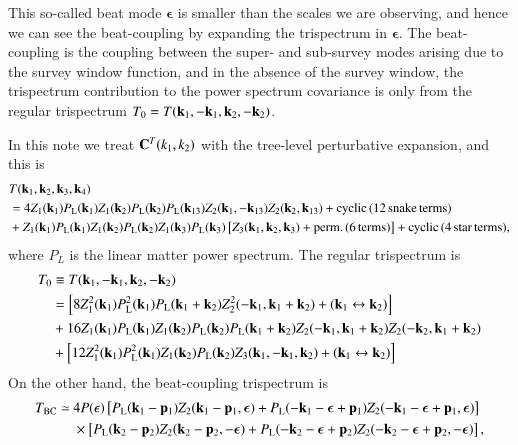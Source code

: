 \documentclass[onecolumn,showpacs,amsmath,amssymb,prd,floatfix,preprintnumbers]{revtex4}
\newcommand{\bk}{{\bf k}}
\newcommand{\bp}{{\bf p}}
\begin{document}
This so-called beat mode ${\boldsymbol \epsilon}$ is smaller than the scales we are observing, and hence we can see the beat-coupling by expanding the trispectrum in ${\boldsymbol \epsilon}$.
The beat-coupling is the coupling between the super- and sub-survey modes arising due to the survey window function, and in the absence of the survey window, the trispectrum contribution to the power spectrum covariance is only from the regular trispectrum $T_0 = T(\bk_1, -\bk_1, \bk_2, -\bk_2)$. 

In this note we treat ${\bf C}^T(k_1,k_2)$ with the tree-level perturbative expansion, and this is 
\begin{align}
  &T(\bk_1, \bk_2, \bk_3, \bk_4) \nonumber \\
  &= 4 Z_1(\bk_1) P_{\rm L}(\bk_1) Z_1(\bk_2) P_{\rm L}(\bk_2) P_{\rm L}(\bk_{13}) Z_2(\bk_1,-\bk_{13}) Z_2(\bk_2,\bk_{13}) + {\rm cyclic} \,(12 \,{\rm snake\,terms}) \nonumber \\
  &+ Z_1(\bk_1) P_{\rm L}(\bk_1) Z_1(\bk_2) P_{\rm L}(\bk_2) Z_1(\bk_3) P_{\rm L}(\bk_3) \left[ Z_3(\bk_1, \bk_2, \bk_3) + {\rm perm.} \,(6\,{\rm terms}) \right] + {\rm cyclic} \,(4\,{\rm star\,terms}),
\end{align}
where $P_L$ is the linear matter power spectrum.
The regular trispectrum is
\begin{align}
\label{eq:trispec_regular}
  T_0 &\equiv T(\bk_1, -\bk_1, \bk_2, -\bk_2) \nonumber \\
  &= \left[ 8 Z_1^2(\bk_1) P_{\rm L}^2(\bk_1) P_{\rm L}(\bk_1+\bk_2) Z_2^2(-\bk_1,\bk_1+\bk_2) + (\bk_1 \leftrightarrow \bk_2) \right] \nonumber \\
  &+ 16 Z_1(\bk_1) P_{\rm L}(\bk_1) Z_1(\bk_2) P_{\rm L}(\bk_2) P_{\rm L}(\bk_1+\bk_2) Z_2(-\bk_1,\bk_1+\bk_2) Z_2(-\bk_2,\bk_1+\bk_2) \nonumber \\
  &+ \left[ 12 Z_1^2(\bk_1) P_{\rm L}^2(\bk_1) Z_1(\bk_2) P_{\rm L}(\bk_2) Z_3(\bk_1,-\bk_1,\bk_2) + (\bk_1 \leftrightarrow \bk_2) \right]
\end{align}
On the other hand, the beat-coupling trispectrum is
\begin{align}
\label{eq:trispec_bc}
  T_{\rm BC} \simeq &~4P(\epsilon) \left[ P_{\rm L}(\bk_1-\bp_1) Z_2(\bk_1-\bp_1, {\boldsymbol \epsilon}) + P_{\rm L}(-\bk_1-{\boldsymbol \epsilon}+\bp_1) Z_2(-\bk_1-{\boldsymbol \epsilon}+\bp_1, {\boldsymbol \epsilon}) \right] \nonumber \\
  &~\times \left[ P_{\rm L}(\bk_2-\bp_2) Z_2(\bk_2-\bp_2, -{\boldsymbol \epsilon}) + P_{\rm L}(-\bk_2-{\boldsymbol \epsilon}+\bp_2) Z_2(-\bk_2-{\boldsymbol \epsilon}+\bp_2, -{\boldsymbol \epsilon}) \right],
\end{align}
\end{document}
